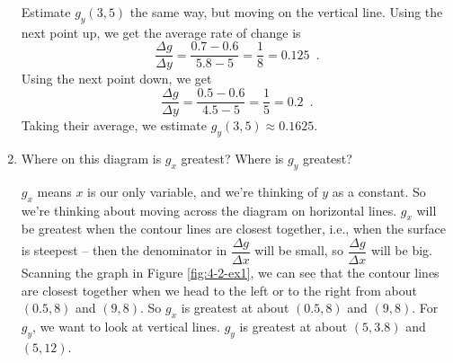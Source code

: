 \begin{example}
\begin{enumerate}[label=(\alph*)]
\begin{solution}
    Estimate $g_y(3,5)$ the same way, but moving on the vertical line. Using the next point up, we get the average rate of change is
    $$\frac{\Delta g}{\Delta y} = \frac{0.7-0.6}{5.8-5}=\frac{1}{8}=0.125 \enspace .$$
    Using the next point down, we get
    $$ \frac{\Delta g}{\Delta y}=\frac{0.5-0.6}{4.5-5}=\frac{1}{5}=0.2 \enspace .$$
    Taking their average, we estimate $g_y(3,5)\approx   0.1625$.
    \end{solution}
    \item Where on this diagram is $g_x$ greatest? Where is $g_y$ greatest?

    \begin{solution}
    $g_x$ means $x$ is our only variable, and we're thinking of $y$ as a constant. So we're thinking about moving across the diagram on horizontal lines. $g_x$ will be greatest when the contour lines are closest together, i.e., when the surface is steepest – then the denominator in $\dfrac{\Delta g}{\Delta x}$ will be small, so $\dfrac{\Delta g}{\Delta x}$ will be big. Scanning the graph in Figure \ref{fig:4-2-ex1}, we can see that the contour lines are closest together when we head to the left or to the right from about $(0.5, 8)$ and $(9, 8)$. So $g_x$ is greatest at about $(0.5, 8)$ and $(9, 8)$. For $g_y$, we want to look at vertical lines. $g_y$ is greatest at about $(5, 3.8)$ and $(5, 12)$.
    \end{solution}
  \end{enumerate}
\end{example}

